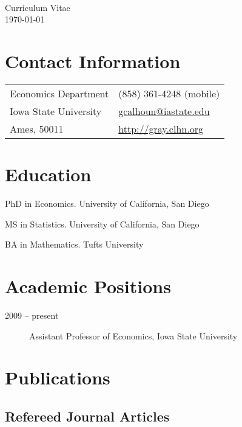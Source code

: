 \documentclass[12pt]{article}%
\newcommand{\allcaps}[1]{\textls{\MakeUppercase{#1}}}
\begin{document}
\RaggedRight

\begin{center}
  \allcaps{\textbf{\large Gray Calhoun}}              \\
  Curriculum Vitae                                    \\
  \today
\end{center}
\section*{Contact Information}
\begin{tabular}{@{}ll@{}}
Economics Department     & (858) 361-4248 (mobile)    \\
Iowa State University    & \url{gcalhoun@iastate.edu} \\
Ames, \allcaps{IA} 50011 & \url{http://gray.clhn.org}
\end{tabular}

\section*{Education}

\begin{description}[noitemsep]
\item[2009] PhD in Economics. University of California, San Diego
\item[2006] MS in Statistics. University of California, San Diego
\item[2001] BA in Mathematics. Tufts University
\end{description}

\section*{Academic Positions}

\begin{description}
\item[2009 -- present] Assistant Professor of Economics, Iowa State University
\end{description}

\section*{Publications}

\subsection*{Refereed Journal Articles}
\end{document}
